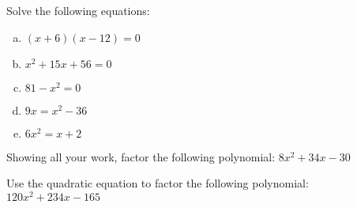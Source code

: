 \documentclass[11pt,letterpaper]{article}
\begin{document}

 Solve the following equations:
	\begin{enumerate}[(a)]
	\item $(x + 6)(x - 12)= 0$
	\item $x^2 + 15x + 56= 0$
	\item $81 - x^2= 0$
	\item $9x= x^2 - 36$
	\item $6x^2= x + 2$
	\end{enumerate}



\newpage



 Showing all your work, factor the following polynomial: $8x^2 + 34x - 30$



\newpage



 Use the quadratic equation to factor the following polynomial: $120x^2 + 234x - 165$
\end{document}
